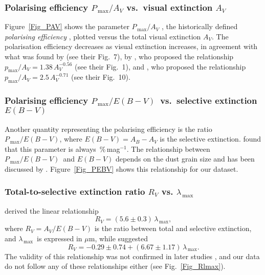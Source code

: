 \documentclass[a4paper]{aa}
\newcommand{\lmax}{\ensuremath{\lambda_\mathrm{\,max}}}
\newcommand{\pmax}{\ensuremath{P_\mathrm{\,max}}}
\begin{document}
\subsubsection{Polarising efficiency $\pmax/A_V$ vs.\ visual extinction $A_V$}
Figure~\ref{Fig_PAV} shows the parameter $\pmax/A_V$ 
, the historically defined {\it \textup{polarising efficiency}}
\citep{Tametal87,Whietal94,Greetal95}, plotted versus the total visual
extinction $A_V$. The polarisation efficiency decreases as visual
extinction increases, in agreement with what was found by
\citet{Whietal94} (see their Fig.~7), by \citet{Geretal95}, who
proposed the relationship $p_\mathrm{max}/A_V = 1.38 \,A_V^{-0.56}$
(see their Fig.~1), and \citet{Whietal01}, who proposed the
relationship $p_\mathrm{max}/A_V = 2.5\,A_V^{-0.71}$ (see their
Fig.~10).

\subsubsection{Polarising efficiency $\pmax/E(B-V)$\ vs.\ selective extinction $E(B-V)$}

Another quantity representing the polarising efficiency is the ratio
$\pmax/E(B-V)$, where $E(B-V) = A_B - A_V$ is the selective
extinction. \citet{Seretal75} found that this parameter is always \,\%\,mag$^{-1}$. The relationship between $\pmax/E(B-V)$\ and
$E(B-V)$ depends on the dust grain size and has been discussed by
\citet{Vosetal16}.  Figure~\ref{Fig_PEBV} shows this relationship for
our dataset.


\subsubsection{Total-to-selective extinction ratio $R_V$ vs. \lmax}
\citet{WhiVan78} derived the linear relationship
\begin{equation}
  R_V = (5.6 \pm 0.3)\,\lmax
  \label{Eq_WhiVan}
,\end{equation}
where $R_V = A_V/E(B-V)$ is the ratio between total and selective
extinction, and \lmax\ is expressed in $\mu$m, while \citet{ClaMat88} suggested 
\begin{equation}
   R_V = -0.29 \pm 0.74 + (6.67 \pm 1.17)\,\lmax
\label{Eq_ClaMat}
.\end{equation}
The validity of this relationship was not confirmed in later studies
\citep[e.g.][]{Whietal01}, and our data do not follow any of these
relationships either (see Fig.~\ref{Fig_Rlmax}).
\end{document}
